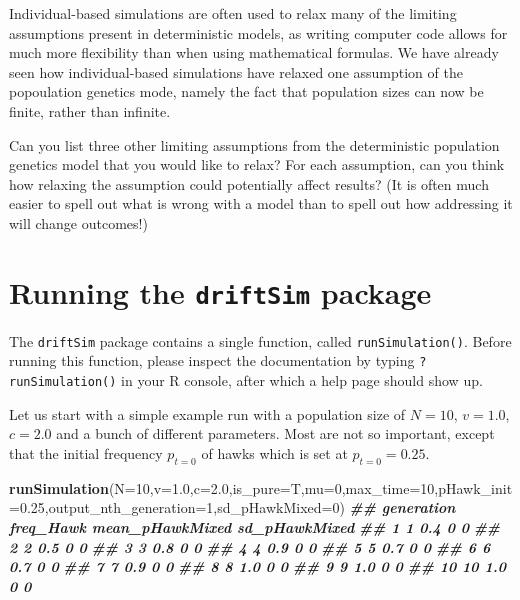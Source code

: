 \documentclass[
]{book}
\newenvironment{Shaded}{\begin{snugshade}}{\end{snugshade}}
\newcommand{\AttributeTok}[1]{\textcolor[rgb]{0.13,0.29,0.53}{#1}}
\newcommand{\DecValTok}[1]{\textcolor[rgb]{0.00,0.00,0.81}{#1}}
\newcommand{\DocumentationTok}[1]{\textcolor[rgb]{0.56,0.35,0.01}{\textbf{\textit{#1}}}}
\newcommand{\FloatTok}[1]{\textcolor[rgb]{0.00,0.00,0.81}{#1}}
\newcommand{\FunctionTok}[1]{\textcolor[rgb]{0.13,0.29,0.53}{\textbf{#1}}}
\newcommand{\NormalTok}[1]{#1}
\begin{document}
Individual-based simulations are often used to relax many of the limiting assumptions present in deterministic models, as writing computer code allows for much more flexibility than when using mathematical formulas. We have already seen how individual-based simulations have relaxed one assumption of the popoulation genetics mode, namely the fact that population sizes can now be finite, rather than infinite.

Can you list three other limiting assumptions from the deterministic population genetics model that you would like to relax? For each assumption, can you think how relaxing the assumption could potentially affect results? (It is often much easier to spell out what is wrong with a model than to spell out how addressing it will change outcomes!)

\section{\texorpdfstring{Running the \texttt{driftSim} package}{Running the driftSim package}}\label{running-the-driftsim-package}

The \texttt{driftSim} package contains a single function, called \texttt{runSimulation()}. Before running this function, please inspect the documentation by typing \texttt{?runSimulation()} in your R console, after which a help page should show up.

Let us start with a simple example run with a population size of \(N=10\), \(v=1.0\), \(c=2.0\) and a bunch of different parameters. Most are not so important, except that the initial frequency \(p_{t=0}\) of hawks which is set at \(p_{t=0} = 0.25\).

\begin{Shaded}
\begin{Highlighting}[]
\FunctionTok{runSimulation}\NormalTok{(}\AttributeTok{N=}\DecValTok{10}\NormalTok{,}\AttributeTok{v=}\FloatTok{1.0}\NormalTok{,}\AttributeTok{c=}\FloatTok{2.0}\NormalTok{,}\AttributeTok{is\_pure=}\NormalTok{T,}\AttributeTok{mu=}\DecValTok{0}\NormalTok{,}\AttributeTok{max\_time=}\DecValTok{10}\NormalTok{,}\AttributeTok{pHawk\_init=}\FloatTok{0.25}\NormalTok{,}\AttributeTok{output\_nth\_generation=}\DecValTok{1}\NormalTok{,}\AttributeTok{sd\_pHawkMixed=}\DecValTok{0}\NormalTok{)}
\DocumentationTok{\#\#    generation freq\_Hawk mean\_pHawkMixed sd\_pHawkMixed}
\DocumentationTok{\#\# 1           1       0.4               0             0}
\DocumentationTok{\#\# 2           2       0.5               0             0}
\DocumentationTok{\#\# 3           3       0.8               0             0}
\DocumentationTok{\#\# 4           4       0.9               0             0}
\DocumentationTok{\#\# 5           5       0.7               0             0}
\DocumentationTok{\#\# 6           6       0.7               0             0}
\DocumentationTok{\#\# 7           7       0.9               0             0}
\DocumentationTok{\#\# 8           8       1.0               0             0}
\DocumentationTok{\#\# 9           9       1.0               0             0}
\DocumentationTok{\#\# 10         10       1.0               0             0}
\end{Highlighting}
\end{Shaded}
\end{document}
